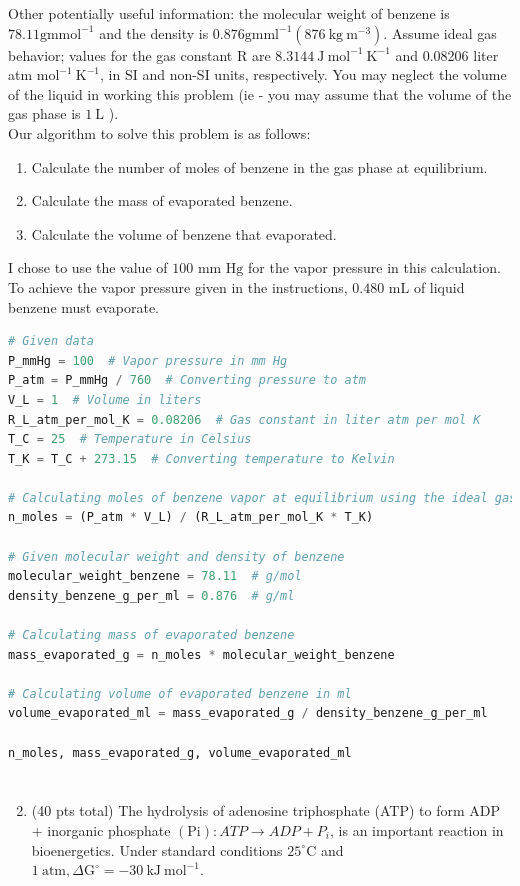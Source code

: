 \documentclass[12 pt]{article}
\begin{document}
Other potentially useful information: the molecular weight of benzene is $78.11 \mathrm{gm} \mathrm{mol}^{-1}$ and the density is $0.876 \mathrm{gm} \mathrm{ml}^{-1}\left(876 \mathrm{~kg} \mathrm{~m}^{-3}\right)$. Assume ideal gas behavior; values for the gas constant $\mathrm{R}$ are $8.3144 \mathrm{~J} \mathrm{~mol}^{-1} \mathrm{~K}^{-1}$ and 0.08206 liter atm $\mathrm{mol}^{-1} \mathrm{~K}^{-1}$, in $\mathrm{SI}$ and non-SI units, respectively. You may neglect the volume of the liquid in working this problem (ie - you may assume that the volume of the gas phase is $1 \mathrm{~L}$ ).\\
Our algorithm to solve this problem is as follows:
\begin{enumerate}
  \item Calculate the number of moles of benzene in the gas phase at equilibrium.
  \item Calculate the mass of evaporated benzene.
  \item Calculate the volume of benzene that evaporated.
\end{enumerate}
I chose to use the value of $100 \text{ mm Hg}$ for the vapor pressure in this calculation.
To achieve the vapor pressure given in the instructions, $0.480 \text{ mL}$ of liquid benzene must evaporate.
\begin{lstlisting}[language=Python]
# Given data
P_mmHg = 100  # Vapor pressure in mm Hg
P_atm = P_mmHg / 760  # Converting pressure to atm
V_L = 1  # Volume in liters
R_L_atm_per_mol_K = 0.08206  # Gas constant in liter atm per mol K
T_C = 25  # Temperature in Celsius
T_K = T_C + 273.15  # Converting temperature to Kelvin

# Calculating moles of benzene vapor at equilibrium using the ideal gas law
n_moles = (P_atm * V_L) / (R_L_atm_per_mol_K * T_K)

# Given molecular weight and density of benzene
molecular_weight_benzene = 78.11  # g/mol
density_benzene_g_per_ml = 0.876  # g/ml

# Calculating mass of evaporated benzene
mass_evaporated_g = n_moles * molecular_weight_benzene

# Calculating volume of evaporated benzene in ml
volume_evaporated_ml = mass_evaporated_g / density_benzene_g_per_ml

n_moles, mass_evaporated_g, volume_evaporated_ml

\end{lstlisting}
\section{}
\begin{enumerate}
  \setcounter{enumi}{1}
  \item (40 pts total) The hydrolysis of adenosine triphosphate (ATP) to form ADP + inorganic phosphate $(\mathrm{Pi}): A T P \rightarrow A D P+P_{i}$, is an important reaction in bioenergetics. Under standard conditions $25^{\circ} \mathrm{C}$ and $1 \mathrm{~atm}, \Delta \mathrm{G}^{\circ}=-30 \mathrm{~kJ} \mathrm{~mol}^{-1}$.
\end{enumerate}
\end{document}
